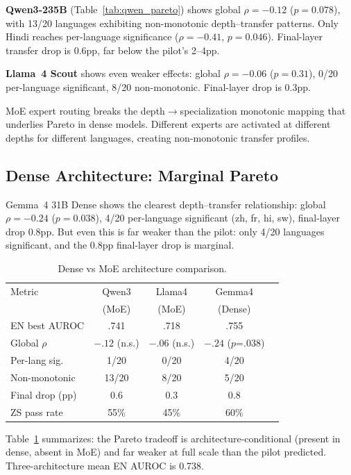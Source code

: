 \documentclass[11pt,a4paper]{article}
\begin{document}
\textbf{Qwen3-235B} (Table~\ref{tab:qwen_pareto}) shows global $\rho{=}-0.12$ ($p{=}0.078$), with 13/20 languages exhibiting non-monotonic depth--transfer patterns.
Only Hindi reaches per-language significance ($\rho{=}-0.41$, $p{=}0.046$).
Final-layer transfer drop is 0.6pp, far below the pilot's 2--4pp.

\textbf{Llama~4 Scout} shows even weaker effects: global $\rho{=}-0.06$ ($p{=}0.31$), 0/20 per-language significant, 8/20 non-monotonic.
Final-layer drop is 0.3pp.

MoE expert routing breaks the depth$\to$specialization monotonic mapping that underlies Pareto in dense models.
Different experts are activated at different depths for different languages, creating non-monotonic transfer profiles.

\subsection{Dense Architecture: Marginal Pareto}

Gemma~4 31B Dense shows the clearest depth--transfer relationship: global $\rho{=}-0.24$ ($p{=}0.038$), 4/20 per-language significant (zh, fr, hi, sw), final-layer drop 0.8pp.
But even this is far weaker than the pilot: only 4/20 languages significant, and the 0.8pp final-layer drop is marginal.

\begin{table}[t]
\centering
\small
\caption{Dense vs MoE architecture comparison.}
\label{tab:arch_compare}
\begin{tabular}{lcccc}
\toprule
Metric & Qwen3 & Llama4 & Gemma4 \\
 & (MoE) & (MoE) & (Dense) \\
\midrule
EN best AUROC & .741 & .718 & .755 \\
Global $\rho$ & $-.12$ (n.s.) & $-.06$ (n.s.) & $-.24$ ($p$=.038) \\
Per-lang sig. & 1/20 & 0/20 & 4/20 \\
Non-monotonic & 13/20 & 8/20 & 5/20 \\
Final drop (pp) & 0.6 & 0.3 & 0.8 \\
ZS pass rate & 55\% & 45\% & 60\% \\
\bottomrule
\end{tabular}
\end{table}

Table~\ref{tab:arch_compare} summarizes: the Pareto tradeoff is architecture-conditional (present in dense, absent in MoE) and far weaker at full scale than the pilot predicted.
Three-architecture mean EN AUROC is 0.738.
\end{document}
